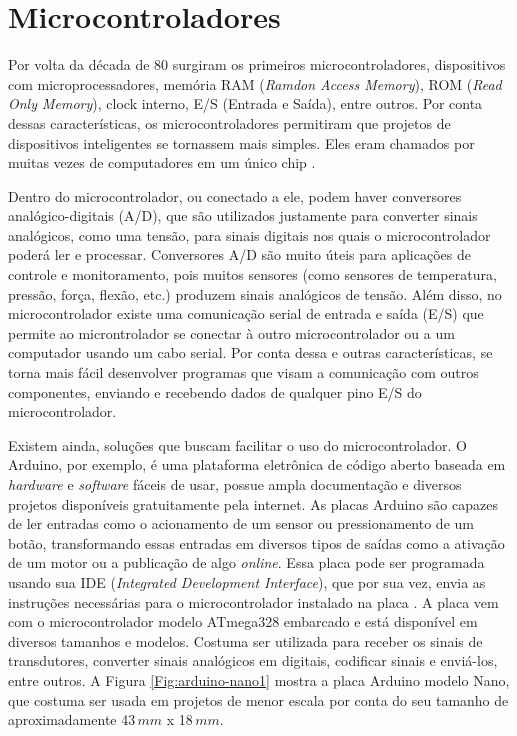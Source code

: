 \documentclass[
	12pt,				%
	openright,			%
	oneside,			%
	a4paper,			%
	english,			%
	brazil				%
	]{abntex2}
\begin{document}
		\section{Microcontroladores}

		Por volta da década de 80 surgiram os primeiros microcontroladores, dispositivos com microprocessadores, memória RAM (\textit{Ramdon Access Memory}), ROM (\textit{Read Only Memory}), clock interno, E/S (Entrada e Saída), entre outros. Por conta dessas características, os microcontroladores permitiram que projetos de dispositivos inteligentes se tornassem mais simples. Eles eram chamados por muitas vezes de computadores em um único chip \cite{pereiramicrocontroladores}. 

		Dentro do microcontrolador, ou conectado a ele, podem haver conversores analógico-digitais (A/D), que são utilizados justamente para converter sinais analógicos, como uma tensão, para sinais digitais nos quais o microcontrolador poderá ler e processar. Conversores A/D são muito úteis para aplicações de controle e monitoramento, pois muitos sensores (como sensores de temperatura, pressão, força, flexão, etc.) produzem sinais analógicos de tensão. Além disso, no microcontrolador existe uma comunicação serial de entrada e saída (E/S) que permite ao microntrolador se conectar à outro microcontrolador ou a um computador usando um cabo serial. Por conta dessa e outras características, se torna mais fácil desenvolver programas que visam a comunicação com outros componentes, enviando e recebendo dados de qualquer pino E/S do microcontrolador. \cite{ibrahim2011advanced}

		Existem ainda, soluções que buscam facilitar o uso do microcontrolador. O Arduino, por exemplo, é uma plataforma eletrônica de código aberto baseada em \textit{hardware} e \textit{software} fáceis de usar, possue ampla documentação e diversos projetos disponíveis gratuitamente pela internet. As placas Arduino são capazes de ler entradas como o acionamento de um sensor ou pressionamento de um botão, transformando essas entradas em diversos tipos de saídas como a ativação de um motor ou a publicação de algo \textit{online}. Essa placa pode ser programada usando sua IDE (\textit{Integrated Development Interface}), que por sua vez, envia as instruções necessárias para o microcontrolador instalado na placa \cite{arduinosite}. A placa vem com o microcontrolador modelo ATmega328 embarcado e está disponível em diversos tamanhos e modelos. Costuma ser utilizada para receber os sinais de transdutores, converter sinais analógicos em digitais, codificar sinais e enviá-los, entre outros. A Figura \ref{Fig:arduino-nano1} mostra a placa Arduino modelo Nano, que costuma ser usada em projetos de menor escala por conta do seu tamanho de aproximadamente 43$\,mm$ x 18$\,mm$.
	
\end{document}
